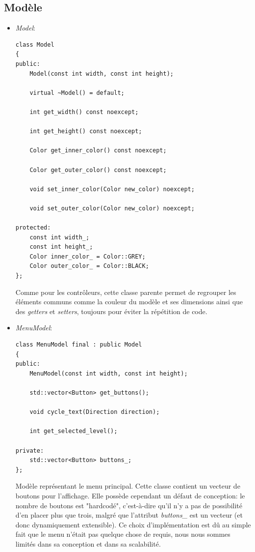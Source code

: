 \documentclass[utf8]{article}
\begin{document}
\subsection{Modèle}
\begin{itemize}
    \item \emph{Model}:
    \begin{verbatim}
class Model
{
public:
    Model(const int width, const int height);

    virtual ~Model() = default;

    int get_width() const noexcept;

    int get_height() const noexcept;

    Color get_inner_color() const noexcept;

    Color get_outer_color() const noexcept;

    void set_inner_color(Color new_color) noexcept;

    void set_outer_color(Color new_color) noexcept;

protected:
    const int width_;
    const int height_;
    Color inner_color_ = Color::GREY;
    Color outer_color_ = Color::BLACK;
};
    \end{verbatim}
    Comme pour les contrôleurs, cette classe parente permet de regrouper les éléments communs comme la couleur du modèle et ses dimensions ainsi que des \emph{getters} et \emph{setters}, toujours pour éviter la répétition de code. \\

    \item \emph{MenuModel}:
    \begin{verbatim}
class MenuModel final : public Model
{
public:
    MenuModel(const int width, const int height);

    std::vector<Button> get_buttons();

    void cycle_text(Direction direction);

    int get_selected_level();

private:
    std::vector<Button> buttons_;
};
    \end{verbatim}
    Modèle représentant le menu principal. Cette classe contient un vecteur de boutons pour l'affichage. Elle possède cependant un défaut de conception: le nombre de boutons est "hardcodé", c'est-à-dire qu'il n'y a pas de possibilité d'en placer plus que trois, malgré que l'attribut \emph{buttons\_} est un vecteur (et donc dynamiquement extensible). Ce choix d'implémentation est dû au simple fait que le menu n'était pas quelque chose de requis, nous nous sommes limités dans sa conception et dans sa scalabilité. \\


\end{itemize}
\end{document}
